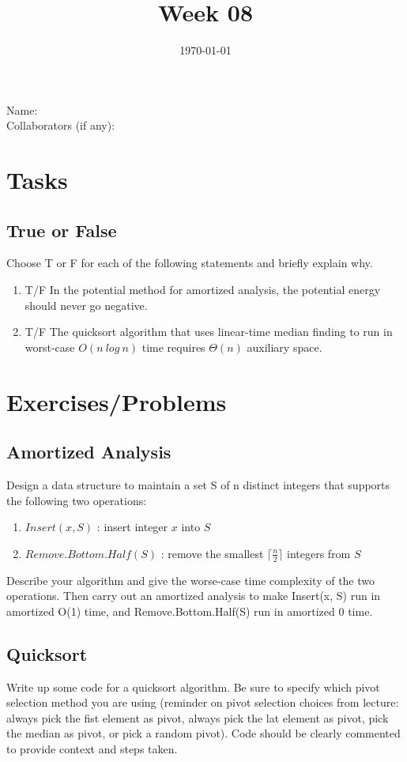 \documentclass[12pt]{amsart}
\title{Week 08}
\date{\today}
\begin{document}
\maketitle


Name: 
\\

Collaborators (if any): 

\section{Tasks}

\subsection{True or False}
Choose T or F for each of the following statements and briefly explain why.  
\begin{enumerate}
\item T/F In the potential method for amortized analysis, the potential energy
should never go negative. 
\item T/F The quicksort algorithm that uses linear-time median finding to run in
worst-case $O(n \: log \: n)$ time requires $\Theta (n)$ auxiliary space.
\end{enumerate}

\section{Exercises/Problems}

\subsection{Amortized Analysis} 
Design a data structure to maintain a set S of n distinct integers that supports the following two operations:
\\

\begin{enumerate} 
\item $Insert(x, S)$ : insert integer $x$ into $S$
\item $Remove.Bottom.Half(S)$ : remove the smallest $\lceil\frac{n}{2}\rceil$ integers from $S$
\\
\end{enumerate}

Describe your algorithm and give the worse-case time complexity of the two operations. Then
carry out an amortized analysis to make Insert(x, S) run in amortized O(1) time, and Remove.Bottom.Half(S) run in amortized 0 time. 

\subsection{Quicksort} 
Write up some code for a quicksort algorithm. Be sure to specify which pivot selection method you are using (reminder on pivot selection choices from lecture: always pick the fist element as pivot, always pick the lat element as pivot, pick the median as pivot, or pick a random pivot). Code should be clearly commented to provide context and steps taken. 
\end{document}
